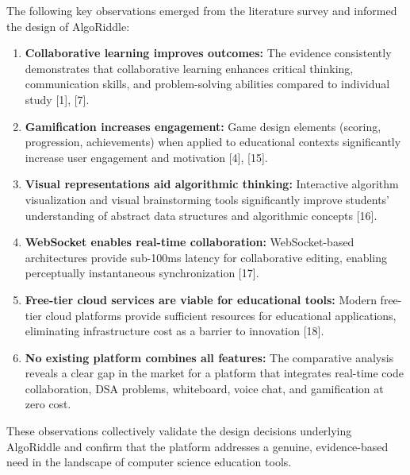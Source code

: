 The following key observations emerged from the literature survey and informed the design of AlgoRiddle:

\begin{enumerate}[label=\arabic*.]
    \item \textbf{Collaborative learning improves outcomes:} The evidence consistently demonstrates that collaborative learning enhances critical thinking, communication skills, and problem-solving abilities compared to individual study [1], [7].
    \item \textbf{Gamification increases engagement:} Game design elements (scoring, progression, achievements) when applied to educational contexts significantly increase user engagement and motivation [4], [15].
    \item \textbf{Visual representations aid algorithmic thinking:} Interactive algorithm visualization and visual brainstorming tools significantly improve students' understanding of abstract data structures and algorithmic concepts [16].
    \item \textbf{WebSocket enables real-time collaboration:} WebSocket-based architectures provide sub-100ms latency for collaborative editing, enabling perceptually instantaneous synchronization [17].
    \item \textbf{Free-tier cloud services are viable for educational tools:} Modern free-tier cloud platforms provide sufficient resources for educational applications, eliminating infrastructure cost as a barrier to innovation [18].
    \item \textbf{No existing platform combines all features:} The comparative analysis reveals a clear gap in the market for a platform that integrates real-time code collaboration, DSA problems, whiteboard, voice chat, and gamification at zero cost.
\end{enumerate}

These observations collectively validate the design decisions underlying AlgoRiddle and confirm that the platform addresses a genuine, evidence-based need in the landscape of computer science education tools.
